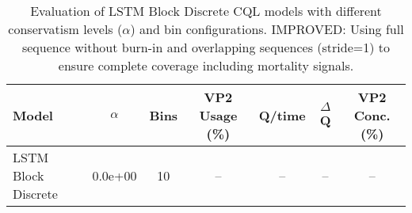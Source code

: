 \begin{table}[ht]
\centering
\caption{Evaluation of LSTM Block Discrete CQL models with different conservatism levels ($\alpha$) and bin configurations. IMPROVED: Using full sequence without burn-in and overlapping sequences (stride=1) to ensure complete coverage including mortality signals.}
\label{tab:lstm_cql_evaluation_improved}
\begin{tabular}{lcccccc}
\toprule
Model & $\alpha$ & Bins & VP2 Usage (\%) & Q/time & $\Delta$Q & VP2 Conc. (\%) \\
\midrule
LSTM Block Discrete & 0.0e+00 & 10 & -- & -- & -- & -- \\
\bottomrule
\end{tabular}
\end{table}